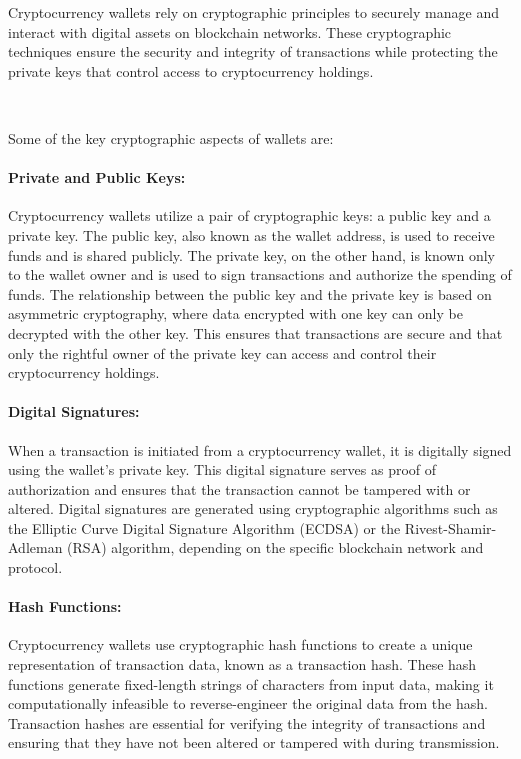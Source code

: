 Cryptocurrency wallets rely on cryptographic principles to securely manage and interact with digital assets on blockchain networks. These cryptographic techniques ensure the security and integrity of transactions while protecting the private keys that control access to cryptocurrency holdings.

~

Some of the key cryptographic aspects of wallets are:

\paragraph{Private and Public Keys:}
Cryptocurrency wallets utilize a pair of cryptographic keys: a public key and a private key. The public key, also known as the wallet address, is used to receive funds and is shared publicly. The private key, on the other hand, is known only to the wallet owner and is used to sign transactions and authorize the spending of funds. The relationship between the public key and the private key is based on asymmetric cryptography, where data encrypted with one key can only be decrypted with the other key. This ensures that transactions are secure and that only the rightful owner of the private key can access and control their cryptocurrency holdings.

\paragraph{Digital Signatures:}
When a transaction is initiated from a cryptocurrency wallet, it is digitally signed using the wallet's private key. This digital signature serves as proof of authorization and ensures that the transaction cannot be tampered with or altered. Digital signatures are generated using cryptographic algorithms such as the Elliptic Curve Digital Signature Algorithm (ECDSA) or the Rivest-Shamir-Adleman (RSA) algorithm, depending on the specific blockchain network and protocol.

\paragraph{Hash Functions:}
Cryptocurrency wallets use cryptographic hash functions to create a unique representation of transaction data, known as a transaction hash. These hash functions generate fixed-length strings of characters from input data, making it computationally infeasible to reverse-engineer the original data from the hash. Transaction hashes are essential for verifying the integrity of transactions and ensuring that they have not been altered or tampered with during transmission.

